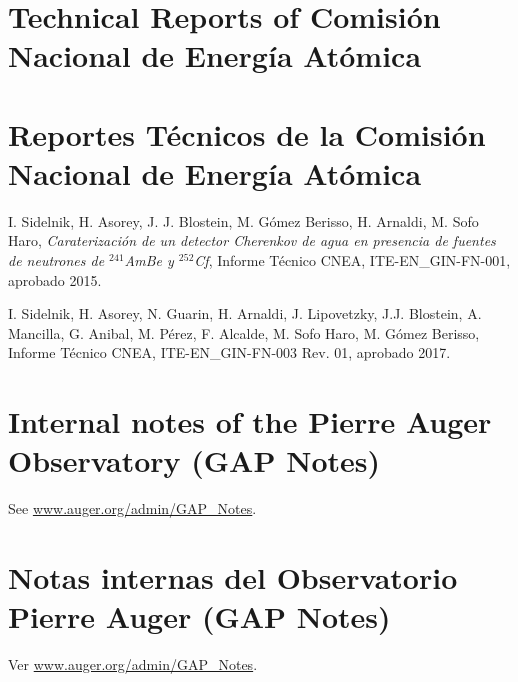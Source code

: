 \ifeng
\section*{Technical Reports of Comisión Nacional de Energía Atómica}
\else
\section*{Reportes Técnicos de la Comisión Nacional de Energía Atómica}
\fi

\noindent
\begin{etaremune}
\item {} I. Sidelnik, H. Asorey, J. J. Blostein, M. Gómez Berisso, H. Arnaldi, M. Sofo Haro, {\emph{Caraterización de un detector Cherenkov de agua en presencia de fuentes de neutrones de $^{241}$AmBe y $^{252}$Cf}}, Informe Técnico CNEA, ITE-EN\_GIN-FN-001, aprobado 2015.

\item {} I. Sidelnik, H. Asorey, N. Guarin, H. Arnaldi, J. Lipovetzky, J.J. Blostein, A. Mancilla, G. Anibal, M. Pérez, F. Alcalde, M. Sofo Haro, M. Gómez Berisso, Informe Técnico CNEA, ITE-EN\_GIN-FN-003 Rev. 01, aprobado 2017.

\end{etaremune}

\ifeng
\section*{Internal notes of the Pierre Auger Observatory (GAP Notes)}

See \href{http://www.auger.org/admin-cgi-bin/woda/gap\_notes.pl/Search?search=asorey}{www.auger.org/admin/GAP\_Notes}.
\else
\section*{Notas internas del Observatorio Pierre Auger (GAP Notes)}

Ver \href{http://www.auger.org/admin-cgi-bin/woda/gap\_notes.pl/Search?search=asorey}{www.auger.org/admin/GAP\_Notes}.
\fi

